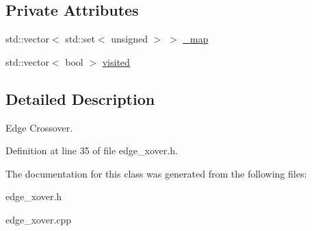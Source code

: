 \subsection*{Private Attributes}
\begin{CompactItemize}
\item 
\hypertarget{classEdgeXover_d41399c6effb54ee48c722f1e19cb3c3}{
std::vector$<$ std::set$<$ unsigned $>$ $>$ \hyperlink{classEdgeXover_d41399c6effb54ee48c722f1e19cb3c3}{\_\-map}}
\label{classEdgeXover_d41399c6effb54ee48c722f1e19cb3c3}

\item 
\hypertarget{classEdgeXover_46d4d4724cf6d660b1a7ab4a346573d4}{
std::vector$<$ bool $>$ \hyperlink{classEdgeXover_46d4d4724cf6d660b1a7ab4a346573d4}{visited}}
\label{classEdgeXover_46d4d4724cf6d660b1a7ab4a346573d4}

\end{CompactItemize}


\subsection{Detailed Description}
Edge Crossover. 



Definition at line 35 of file edge\_\-xover.h.

The documentation for this class was generated from the following files:\begin{CompactItemize}
\item 
edge\_\-xover.h\item 
edge\_\-xover.cpp\end{CompactItemize}
